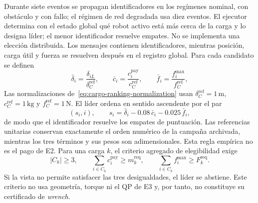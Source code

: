 Durante siete eventos se propagan identificadores en los regímenes nominal, con obstáculo y con fallo; el régimen de red degradada usa diez eventos. El ejecutor determina con el estado global qué robot activo está más cerca de la carga y lo designa líder; el menor identificador resuelve empates. No se implementa una elección distribuida. Los mensajes contienen identificadores, mientras posición, carga útil y fuerza se resuelven después en el registro global. Para cada candidato se definen
\begin{equation}
 \bar\delta_i=\frac{\delta_{iL}}{\delta_C^{\mathrm{ref}}},\qquad
 \bar c_i=\frac{c_i^{\mathrm{pay}}}{c_C^{\mathrm{ref}}},\qquad
 \bar f_i=\frac{f_i^{\max}}{f_C^{\mathrm{ref}}},
 \label{eq:cargo-ranking-normalization}
\end{equation}
Las normalizaciones de~\eqref{eq:cargo-ranking-normalization} usan $\delta_C^{\mathrm{ref}}=1\,\mathrm{m}$, $c_C^{\mathrm{ref}}=1\,\mathrm{kg}$ y $f_C^{\mathrm{ref}}=1\,\mathrm{N}$. El líder ordena en sentido ascendente por el par
\begin{equation}
 \left(s_i,i\right),\qquad
 s_i=\bar\delta_i-0.08\,\bar c_i-0.025\,\bar f_i,
 \label{eq:cargo-ranking}
\end{equation}
de modo que el identificador resuelve los empates de puntuación. Las referencias unitarias conservan exactamente el orden numérico de la campaña archivada, mientras los tres términos y sus pesos son adimensionales. Esta regla empírica no es el pago de E2. Para una carga $k$, el criterio agregado de elegibilidad exige
\begin{equation}
 |C_k|\geq3,\qquad
 \sum_{i\in C_k}c_i^{\mathrm{pay}}\geq m_k^{\mathrm{req}},\qquad
 \sum_{i\in C_k}f_i^{\max}\geq F_k^{\mathrm{req}}.
 \label{eq:cargo-aggregate-certificate}
\end{equation}
Si la vista no permite satisfacer las tres desigualdades, el líder se abstiene. Este criterio no usa geometría, torque ni el QP de E3 y, por tanto, no constituye su certificado de \emph{wrench}.

